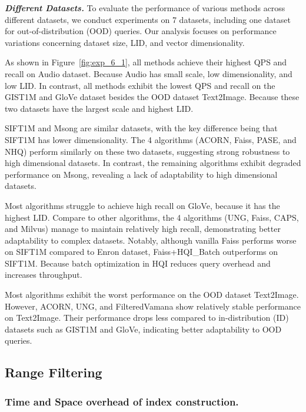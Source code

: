 \documentclass[sigconf, nonacm]{acmart}
\begin{document}
	\textit{\textbf{Different Datasets.}}  
	To evaluate the performance of various methods across different datasets, we conduct experiments on 7 datasets, including one dataset for out-of-distribution (OOD) queries. Our analysis focuses on performance variations concerning dataset size, LID, and vector dimensionality.
	
	As shown in Figure~\ref{fig:exp_6_1}, all methods achieve their highest QPS and recall on Audio dataset. Because Audio has small scale, low dimensionality, and low LID. In contrast, all methods exhibit the lowest QPS and recall on the GIST1M and GloVe dataset besides the OOD dataset Text2Image. Because these two datasets have the largest scale and highest LID.
	
	SIFT1M and Msong are similar datasets, with the key difference being that SIFT1M has lower dimensionality. The 4 algorithms (ACORN, Faiss, PASE, and NHQ) perform similarly on these two datasets, suggesting strong robustness to high dimensional datasets. In contrast, the remaining algorithms exhibit degraded performance on Msong, revealing a lack of adaptability to high dimensional datasets.
	
	Most algorithms struggle to achieve high recall on GloVe, because it has the highest LID. Compare to other algorithms, the 4 algorithms (UNG, Faiss, CAPS, and Milvus) manage to maintain relatively high recall, demonstrating better adaptability to complex datasets. Notably, although vanilla Faiss performs worse on SIFT1M compared to Enron dataset, Faiss+HQI\_Batch outperforms on SIFT1M. Because batch optimization in HQI reduces query overhead and increases throughput.
	
	Most algorithms exhibit the worst performance on the OOD dataset Text2Image. However, ACORN, UNG, and FilteredVamana show relatively stable performance on Text2Image. Their performance drops less compared to in-distribution (ID) datasets such as GIST1M and GloVe, indicating better adaptability to OOD queries.
	
	\subsection{Range Filtering}
	
	\subsubsection{Time and Space overhead of index construction.}
	
\end{document}
